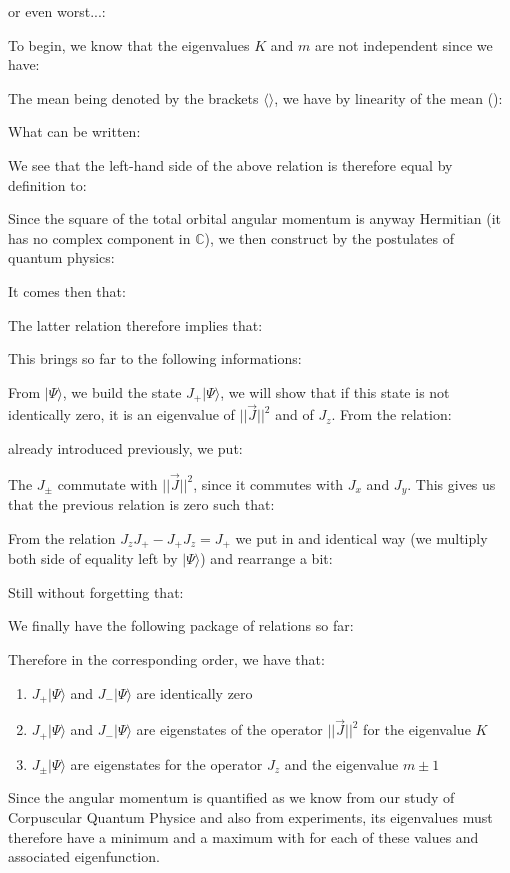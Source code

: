 	or even worst...:
	
	To begin, we know that the eigenvalues $K$ and $m$ are not independent since we have:
	
	The mean being denoted by the brackets $\langle \rangle$, we have by linearity of the mean ():
	
	What can be written:
	
	We see that the left-hand side of the above relation is therefore equal by definition to:
	
	Since the square of the total orbital angular momentum is anyway Hermitian (it has no complex component in $\mathbb{C}$), we then construct by the postulates of quantum physics:
	
	It comes then that:
	
	The latter relation therefore implies that:
	
	This brings so far to the following informations:
	
	From $|\Psi\rangle$, we build the state $J_+|\Psi\rangle$, we will show that if this state is not identically zero, it is an eigenvalue of $||\vec{J}||^2$ and of $J_z$. From the relation:
	
	already introduced previously, we put:
	
	The $J_{\pm}$ commutate with $||\vec{J}||^2$, since it commutes with $J_x$ and $J_y$. This gives us that the previous relation is zero such that:
	
	From the relation $J_zJ_+-J_+J_z=J_+$ we put in and identical way (we multiply both side of equality left by $|\Psi\rangle$) and rearrange a bit:
	
	Still without forgetting that:
	
	We finally have the following package of relations so far:
	
	Therefore in the corresponding order, we have that:
	\begin{enumerate}
		\item $J_+|\Psi\rangle$ and $J_-|\Psi\rangle$ are identically zero
		\item $J_+|\Psi\rangle$ and $J_-|\Psi\rangle$ are eigenstates of the operator $||\vec{J}||^2$ for the eigenvalue $K$
		
		\item $J_\pm|\Psi\rangle$ are eigenstates for the operator $J_z$ and the eigenvalue $m\pm 1$
	\end{enumerate} 
	Since the angular momentum is quantified as we know from our study of Corpuscular Quantum Physice and also from experiments, its eigenvalues must therefore have a minimum and a maximum with for each of these values and associated eigenfunction.
	

